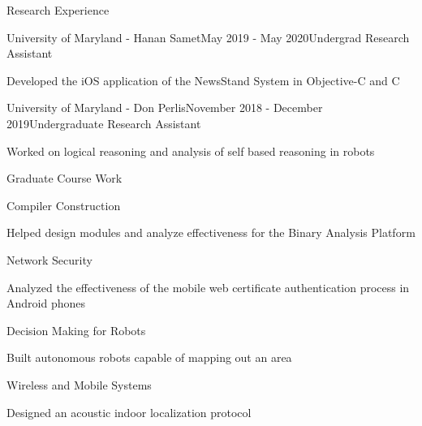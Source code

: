 \documentclass{resume} %
\begin{document}
\begin{rSection}{Research Experience}

\begin{rSubsection}{University of Maryland - Hanan Samet}{May 2019 - May 2020}{Undergrad Research Assistant}{}
\item Developed the iOS application of the NewsStand System in Objective-C and C
\end{rSubsection}

\begin{rSubsection}{University of Maryland - Don Perlis}{November 2018 - December 2019}{Undergraduate Research Assistant}{}
\item Worked on logical reasoning and analysis of self based reasoning in robots
\end{rSubsection}

\end{rSection}


\begin{rSection}{Graduate Course Work}

\begin{rSubsection}{Compiler Construction}{}{}{}
\item Helped design modules and analyze effectiveness for the Binary Analysis Platform
\end{rSubsection}

\begin{rSubsection}{Network Security}{}{}{}
\item Analyzed the effectiveness of the mobile web certificate authentication process in Android phones
\end{rSubsection}

\begin{rSubsection}{Decision Making for Robots}{}{}{}
\item Built autonomous robots capable of mapping out an area
\end{rSubsection}

\begin{rSubsection}{Wireless and Mobile Systems}{}{}{}
\item Designed an acoustic indoor localization protocol 
\end{rSubsection}

\end{rSection}
\end{document}
